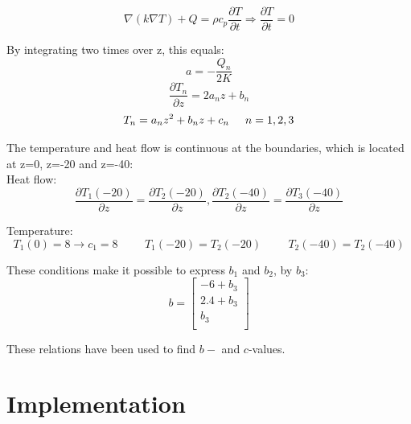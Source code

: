\documentclass[10pt,a4paper]{article}
\begin{document}
\begin{equation}
\nabla(k\nabla T) +Q=\rho c_p \frac{\partial T}{\partial t} \Rightarrow \frac{\partial T}{\partial t}=0
\end{equation}

\noindent By integrating two times over z, this equals:
\begin{equation}
a=-\frac{Q_n}{2K}
\end{equation}
\begin{equation}
\frac{\partial T_n}{\partial z}=2a_nz+b_n
\end{equation}
\begin{equation}
T_n=a_nz^2+b_nz+c_n \hspace{0.5cm} n= 1,2,3
\end{equation}

\noindent The temperature and heat flow is continuous at the boundaries, which is located at z=0, z=-20 and z=-40:\\

\noindent Heat flow:
\begin{equation}
\frac{ \partial T_1(-20)}{\partial z}=\frac{\partial T_2(-20)}{\partial z},
\frac{\partial T_2(-40)}{\partial z}=\frac{\partial T_3(-40)}{\partial z}
\end{equation}

\noindent Temperature:
\begin{equation}
T_1(0)=8 \rightarrow c_1=8 \hspace{1cm}
T_1(-20)=T_2(-20) \hspace{1cm}
T_2(-40)=T_2(-40)
\end{equation}




\noindent These conditions make it possible to express $b_1$ and $b_2$, by $b_3$:\\

\begin{equation}
b=\begin{bmatrix}
-6+b_3\\
2.4+b_3\\
b_3\\
\end{bmatrix}
\end{equation}

\noindent These relations have been used to find $b-$ and $c$-values.






\section*{Implementation}
\end{document}
